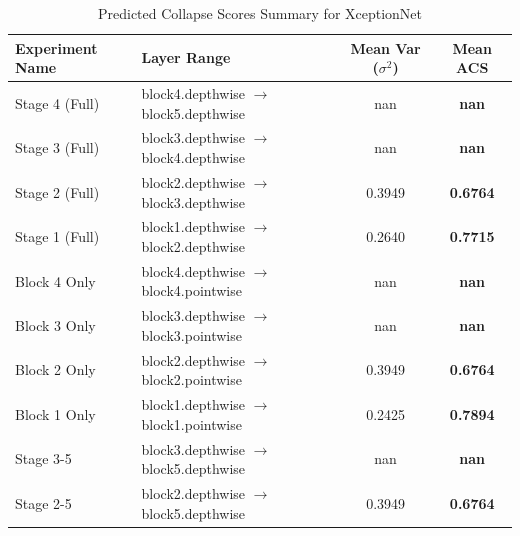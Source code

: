 \begin{table}[h]
\caption{Predicted Collapse Scores Summary for XceptionNet}
\label{tab:acs_summary_xceptionnet}
\begin{tabular}{llcc}
\toprule
Experiment Name & Layer Range & Mean Var ($\sigma^2$) & Mean ACS \\
\midrule
Stage 4 (Full) & block4.depthwise $\to$ block5.depthwise & nan & \textbf{nan} \\
Stage 3 (Full) & block3.depthwise $\to$ block4.depthwise & nan & \textbf{nan} \\
Stage 2 (Full) & block2.depthwise $\to$ block3.depthwise & 0.3949 & \textbf{0.6764} \\
Stage 1 (Full) & block1.depthwise $\to$ block2.depthwise & 0.2640 & \textbf{0.7715} \\
Block 4 Only & block4.depthwise $\to$ block4.pointwise & nan & \textbf{nan} \\
Block 3 Only & block3.depthwise $\to$ block3.pointwise & nan & \textbf{nan} \\
Block 2 Only & block2.depthwise $\to$ block2.pointwise & 0.3949 & \textbf{0.6764} \\
Block 1 Only & block1.depthwise $\to$ block1.pointwise & 0.2425 & \textbf{0.7894} \\
Stage 3-5 & block3.depthwise $\to$ block5.depthwise & nan & \textbf{nan} \\
Stage 2-5 & block2.depthwise $\to$ block5.depthwise & 0.3949 & \textbf{0.6764} \\
\bottomrule
\end{tabular}
\end{table}
